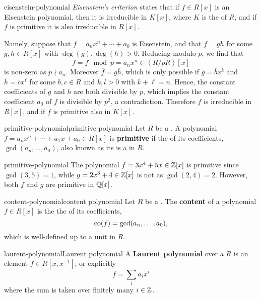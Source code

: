 \begin{example}{eisenstein-polynomial}
    \textit{Eisenstein's criterion} states that if $f \in R[x]$ is an Eisenstein polynomial, then it is irreducible in $K[x]$, where $K$ is the  of $R$, and if $f$ is primitive it is also irreducible in $R[x]$.
    
    Namely, suppose that $f = a_n x^n + \cdots + a_0$ is Eisenstein, and that $f = gh$ for some $g, h \in R[x]$ with $\deg(g), \deg(h) > 0$. Reducing modulo $p$, we find that
    \[ \overline{f} = f \mod p = \overline{a}_n x^n \in (R/pR)[x] \]
    is non-zero as $p \nmid a_n$. Moreover $\overline{f} = \overline{g} \overline{h}$, which is only possible if $\overline{g} = \overline{b} x^k$ and $\overline{h} = \overline{c} x^\ell$ for some $b, c \in R$ and $k, l > 0$ with $k + \ell = n$. Hence, the constant coefficients of $g$ and $h$ are both divisible by $p$, which implies the constant coefficient $a_0$ of $f$ is divisible by $p^2$, a contradiction. Therefore $f$ is irreducible in $R[x]$, and if $f$ is primitive also in $K[x]$.
\end{example}

\begin{topic}{primitive-polynomial}{primitive polynomial}
    Let $R$ be a . A polynomial $f = a_n x^n + \cdots + a_1 x + a_0 \in R[x]$ is \textbf{primitive} if the  of its coefficients, $\gcd(a_n, \ldots, a_0)$, also known as its  is a  in $R$.
\end{topic}

\begin{example}{primitive-polynomial}
    The polynomial $f = 3x^4 + 5x \in \mathbb{Z}[x]$ is primitive since $\gcd(3, 5) = 1$, while $g = 2x^3 + 4 \in \mathbb{Z}[x]$ is not as $\gcd(2, 4) = 2$. However, both $f$ and $g$ are primitive in $\mathbb{Q}[x]$.
\end{example}

\begin{topic}{content-polynomial}{content polynomial}
    Let $R$ be a . The \textbf{content} of a polynomial $f \in R[x]$ is the the  of its coefficients,
    \[ \textup{co}(f) = \gcd(a_n, \ldots, a_0) , \]
    which is well-defined up to a unit in $R$.
\end{topic}

\begin{topic}{laurent-polynomial}{Laurent polynomial}
    A \textbf{Laurent polynomial} over a  $R$ is an element $f \in R[x, x^{-1}]$, or explicitly
    \[ f = \sum_{i} a_i x^i \]
    where the sum is taken over finitely many $i \in \mathbb{Z}$.
\end{topic}

